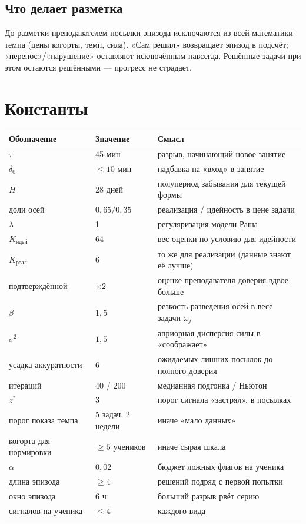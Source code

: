 \documentclass[11pt,a4paper]{article}
\begin{document}
\subsection*{Что делает разметка}

До разметки преподавателем посылки эпизода исключаются из всей математики темпа
(цены когорты, темп, сила). «Сам решил» возвращает эпизод в подсчёт;
«перенос»/«нарушение» оставляют исключённым навсегда. Решённые задачи при этом
остаются решёнными --- прогресс не страдает.

\section{Константы}

\begin{center}
\begin{tabular}{@{}llp{7.4cm}@{}}
\toprule
Обозначение & Значение & Смысл \\
\midrule
$\tau$ & 45 мин & разрыв, начинающий новое занятие \\
$\delta_0$ & $\leq 10$ мин & надбавка на «вход» в занятие \\
$H$ & 28 дней & полупериод забывания для текущей формы \\
доли осей & $0{,}65 / 0{,}35$ & реализация / идейность в цене задачи \\
$\lambda$ & 1 & регуляризация модели Раша \\
$K_{\text{идей}}$ & 64 & вес оценки по условию для идейности \\
$K_{\text{реал}}$ & 6 & то же для реализации (данные знают её лучше) \\
подтверждённой & $\times 2$ & оценке преподавателя доверия вдвое больше \\
$\beta$ & $1{,}5$ & резкость разведения осей в весе задачи $\omega_j$ \\
$\sigma^2$ & $1{,}5$ & априорная дисперсия силы в «соображает» \\
усадка аккуратности & 6 & ожидаемых лишних посылок до полного доверия \\
итераций & 40 / 200 & медианная подгонка / Ньютон \\
$z^{*}$ & 3 & порог сигнала «застрял», в посылках \\
порог показа темпа & 5 задач, 2 недели & иначе «мало данных» \\
когорта для нормировки & $\geq 5$ учеников & иначе сырая шкала \\
$\alpha$ & $0{,}02$ & бюджет ложных флагов на ученика \\
длина эпизода & $\geq 4$ & решений подряд с первой попытки \\
окно эпизода & 6 ч & больший разрыв рвёт серию \\
сигналов на ученика & $\leq 4$ & каждого вида \\
\bottomrule
\end{tabular}
\end{center}
\end{document}
